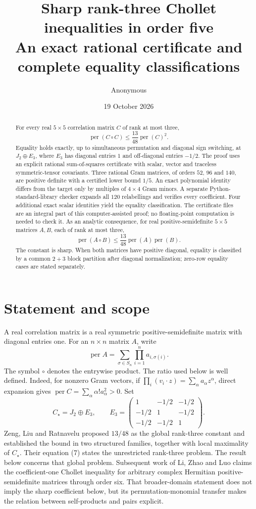 \documentclass[11pt,a4paper]{article}
\title{Sharp rank-three Chollet inequalities in order five\\[3pt]\large An exact rational certificate and complete equality classifications}
\author{Anonymous}
\date{19 October 2026}
\newcommand{\per}{\operatorname{per}}
\theoremstyle{remark}\newtheorem{remark}[theorem]{Remark}
\begin{document}
\maketitle
\begin{abstract}
For every real $5\times5$ correlation matrix $C$ of rank at most three,
\[
 \per(C\circ C)\leq \frac{13}{48}\per(C)^2.
\]
Equality holds exactly, up to simultaneous permutation and diagonal sign switching, at $J_2\oplus E_3$, where $E_3$ has diagonal entries $1$ and off-diagonal entries $-1/2$. The proof uses an explicit rational sum-of-squares certificate with scalar, vector and traceless symmetric-tensor covariants. Three rational Gram matrices, of orders $52$, $96$ and $140$, are positive definite with a certified lower bound $1/5$. An exact polynomial identity differs from the target only by multiples of $4\times4$ Gram minors. A separate Python-standard-library checker expands all $120$ relabellings and verifies every coefficient. Four additional exact scalar identities yield the equality classification. The certificate files are an integral part of this computer-assisted proof; no floating-point computation is needed to check it. As an analytic consequence, for real positive-semidefinite $5\times5$ matrices $A,B$, each of rank at most three,
\[
 \per(A\circ B)\leq \frac{13}{48}\per(A)\per(B).
\]
The constant is sharp. When both matrices have positive diagonal, equality is classified by a common $2+3$ block partition after diagonal normalization; zero-row equality cases are stated separately.
\end{abstract}

\section{Statement and scope}
A real correlation matrix is a real symmetric positive-semidefinite matrix with diagonal entries one. For an $n\times n$ matrix $A$, write
\[
 \per A=\sum_{\sigma\in S_n}\prod_{i=1}^n a_{i,\sigma(i)}.
\]
The symbol $\circ$ denotes the entrywise product. The ratio used below is well defined. Indeed, for nonzero Gram vectors, if $\prod_i(v_i\cdot z)=\sum_\alpha a_\alpha z^\alpha$, direct expansion gives $\per C=\sum_\alpha\alpha!a_\alpha^2>0$. Set
\[
 C_\star=J_2\oplus E_3,
 \qquad E_3=\begin{pmatrix}1&-1/2&-1/2\\-1/2&1&-1/2\\-1/2&-1/2&1\end{pmatrix}.
\]
Zeng, Liu and Ratnavelu \cite{ZLR} proposed $13/48$ as the global rank-three constant and established the bound in two structured families, together with local maximality of $C_\star$. Their equation (7) states the unrestricted rank-three problem. The result below concerns that global problem. Subsequent work of Li, Zhao and Luo \cite{LZL} claims the coefficient-one Chollet inequality for arbitrary complex Hermitian positive-semidefinite matrices through order six. That broader-domain statement does not imply the sharp coefficient below, but its permutation-monomial transfer makes the relation between self-products and pairs explicit.
\end{document}
